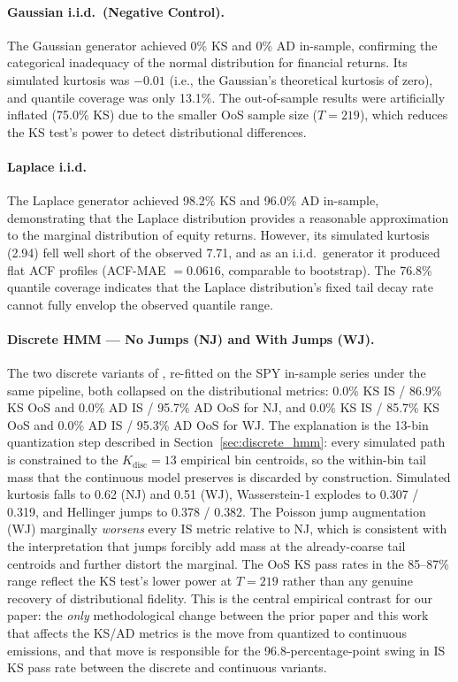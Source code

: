 \paragraph{Gaussian i.i.d.\ (Negative Control).}
The Gaussian generator achieved 0\% KS and 0\% AD in-sample, confirming the categorical inadequacy of the normal distribution for financial returns.
Its simulated kurtosis was $-0.01$ (i.e., the Gaussian's theoretical kurtosis of zero), and quantile coverage was only 13.1\%.
The out-of-sample results were artificially inflated (75.0\% KS) due to the smaller OoS sample size ($T = 219$), which reduces the KS test's power to detect distributional differences.

\paragraph{Laplace i.i.d.}
The Laplace generator achieved 98.2\% KS and 96.0\% AD in-sample, demonstrating that the Laplace distribution provides a reasonable approximation to the marginal distribution of equity returns.
However, its simulated kurtosis (2.94) fell well short of the observed 7.71, and as an i.i.d.\ generator it produced flat ACF profiles (ACF-MAE $= 0.0616$, comparable to bootstrap).
The 76.8\% quantile coverage indicates that the Laplace distribution's fixed tail decay rate cannot fully envelop the observed quantile range.

\paragraph{Discrete HMM --- No Jumps (NJ) and With Jumps (WJ).}
The two discrete variants of \citet{alswaidan2026hybrid}, re-fitted on the SPY in-sample series under the same pipeline, both collapsed on the distributional metrics: 0.0\% KS IS / 86.9\% KS OoS and 0.0\% AD IS / 95.7\% AD OoS for NJ, and 0.0\% KS IS / 85.7\% KS OoS and 0.0\% AD IS / 95.3\% AD OoS for WJ.
The explanation is the 13-bin quantization step described in Section~\ref{sec:discrete_hmm}: every simulated path is constrained to the $K_{\text{disc}} = 13$ empirical bin centroids, so the within-bin tail mass that the continuous model preserves is discarded by construction.
Simulated kurtosis falls to 0.62 (NJ) and 0.51 (WJ), Wasserstein-1 explodes to 0.307 / 0.319, and Hellinger jumps to 0.378 / 0.382.
The Poisson jump augmentation (WJ) marginally \emph{worsens} every IS metric relative to NJ, which is consistent with the interpretation that jumps forcibly add mass at the already-coarse tail centroids and further distort the marginal.
The OoS KS pass rates in the 85--87\% range reflect the KS test's lower power at $T = 219$ rather than any genuine recovery of distributional fidelity.
This is the central empirical contrast for our paper: the \emph{only} methodological change between the prior paper and this work that affects the KS/AD metrics is the move from quantized to continuous emissions, and that move is responsible for the 96.8-percentage-point swing in IS KS pass rate between the discrete and continuous variants.

